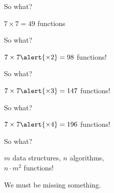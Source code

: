 \documentclass[aspectratio=169]{beamer}
\begin{document}

\begin{frame}{So what?}
  \begin{center}
    \Large$7 \times 7 = 49$ functions
  \end{center}
\end{frame}


\begin{frame}{So what?}
  \begin{center}
    \Large$7 \times 7 \alert{\times 2} = 98$ functions!
  \end{center}
\end{frame}


\begin{frame}{So what?}
  \begin{center}
    \Large$7 \times 7 \alert{\times 3} = 147$ functions!
  \end{center}
\end{frame}


\begin{frame}{So what?}
  \begin{center}
    \Large$7 \times 7 \alert{\times 4} = 196$ functions!
  \end{center}
\end{frame}


\begin{frame}{So what?}
  \begin{center}
    \large $m$ data structures, $n$ algorithms,\\
    \Huge $n \cdot m^2$ functions!
  \end{center}
\end{frame}


\begin{frame}[standout]
  We must be missing something.
\end{frame}
\end{document}
